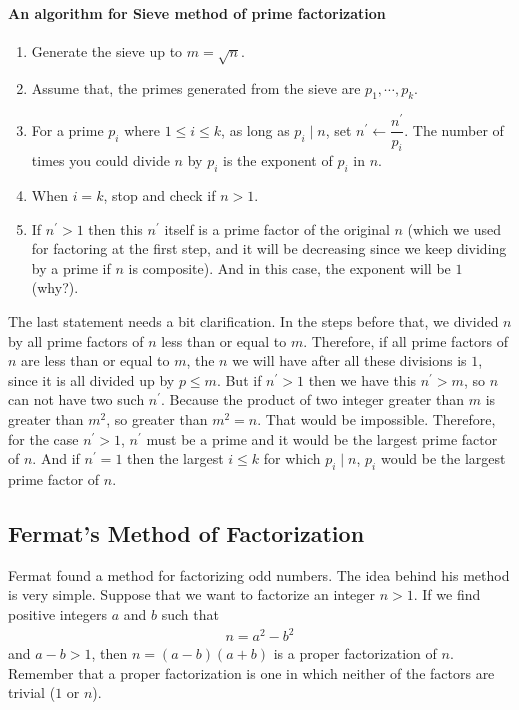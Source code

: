 \documentclass{subfiles}
\begin{document}
	\paragraph{An algorithm for Sieve method of prime factorization}
		\begin{enumerate}[1.]
			\item Generate the sieve up to $m=\sqrt{n}$.
			\item Assume that, the primes generated from the sieve are $p_1,\cdots,p_k$.
			\item For a prime $p_i$ where $1\leq i\leq k$, as long as $p_i\mid n$, set $n^\prime\longleftarrow\dfrac{n^\prime}{p_i}$. The number of times you could divide $n$ by $p_i$ is the exponent of $p_i$ in $n$.
			\item When $i=k$, stop and check if $n>1$.
			\item If $n^\prime>1$ then this $n^\prime$ itself is a prime factor of the original $n$ (which we used for factoring at the first step, and it will be decreasing since we keep dividing by a prime if $n$ is composite). And in this case, the exponent will be $1$ (why?).
		\end{enumerate}
	The last statement needs a bit clarification. In the steps before that, we divided $n$ by all prime factors of $n$ less than or equal to $m$. Therefore, if all prime factors of $n$ are less than or equal to $m$, the $n$ we will have after all these divisions is $1$, since it is all divided up by $p\leq m$. But if $n^\prime>1$ then we have this $n^\prime>m$, so $n$ can not have two such $n^\prime$. Because the product of two integer greater than $m$ is greater than $m^2$, so greater than $m^2=n$. That would be impossible. Therefore, for the case $n^\prime>1$, $n^\prime$ must be a prime and it would be the largest prime factor of $n$. And if $n^\prime=1$ then the largest $i\leq k$ for which $p_i\mid n$, $p_i$ would be the largest prime factor of $n$.
\subsection{Fermat's Method of Factorization}
	Fermat found a method for factorizing odd numbers. The idea behind his method is very simple. Suppose that we want to factorize an integer $n>1$. If we find positive integers $a$ and $b$ such that
		\begin{align*}
			n=a^2-b^2
		\end{align*}
	and $a-b >1$, then $n=(a-b)(a+b)$ is a proper factorization of $n$. Remember that a proper factorization is one in which neither of the factors are trivial ($1$ or $n$).
\end{document}

